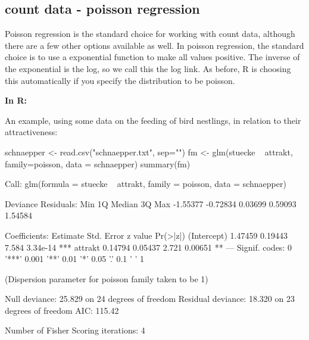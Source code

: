 \documentclass[a4paper,twoside]{tufte-book}\usepackage[]{graphicx}\usepackage[]{color}
\begin{document}
{\begin{fullwidth}
\begin{mdframed}
\end{mdframed}
\end{fullwidth} 




\subsection{count data - poisson regression}

Poisson regression is the standard choice for working with count data, although there are a few other options available as well. In poisson regression, the standard choice is to use a exponential function to make all values positive. The inverse of the exponential is the log, so we call this the log link. As before, R is choosing this automatically if you specify the distribution to be poisson. 

\vspace{1cm}
\begin{fullwidth}
\begin{mdframed}
    
\textbf{In R:} 

An example, using some data on the feeding of bird nestlings, in relation to their attractiveness:
\begin{Schunk}
\begin{Sinput}
schnaepper <- read.csv("schnaepper.txt", sep="")
fm <- glm(stuecke ~ attrakt, family=poisson, data = schnaepper)
summary(fm)
\end{Sinput}
\begin{Soutput}

Call:
glm(formula = stuecke ~ attrakt, family = poisson, data = schnaepper)

Deviance Residuals: 
     Min        1Q    Median        3Q       Max  
-1.55377  -0.72834   0.03699   0.59093   1.54584  

Coefficients:
            Estimate Std. Error z value Pr(>|z|)    
(Intercept)  1.47459    0.19443   7.584 3.34e-14 ***
attrakt      0.14794    0.05437   2.721  0.00651 ** 
---
Signif. codes:  0 '***' 0.001 '**' 0.01 '*' 0.05 '.' 0.1 ' ' 1

(Dispersion parameter for poisson family taken to be 1)

    Null deviance: 25.829  on 24  degrees of freedom
Residual deviance: 18.320  on 23  degrees of freedom
AIC: 115.42

Number of Fisher Scoring iterations: 4
\end{Soutput}
\end{Schunk}


\end{mdframed}
\end{fullwidth}}
\end{document}
